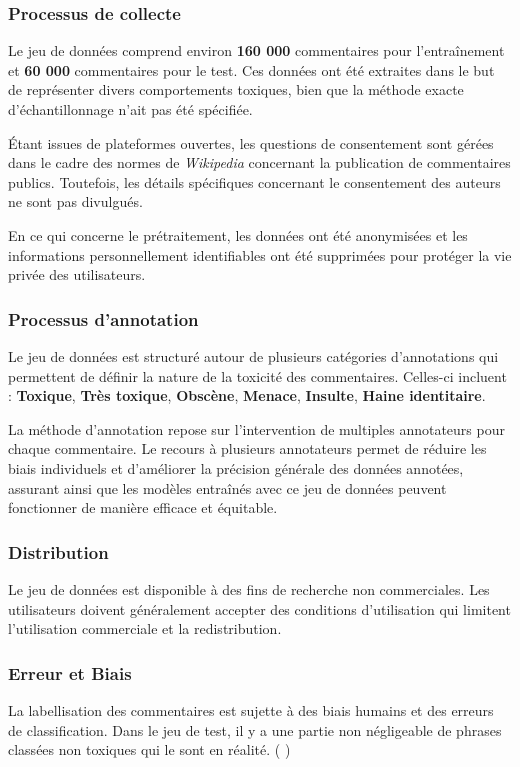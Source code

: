\newpage
\subsubsection*{Processus de collecte}
Le jeu de données comprend environ \textbf{160 000} commentaires pour l'entraînement et \textbf{60 000} commentaires pour le test. Ces données ont été extraites dans le but de représenter divers comportements toxiques, bien que la méthode exacte d'échantillonnage n'ait pas été spécifiée. 

Étant issues de plateformes ouvertes, les questions de consentement sont gérées dans le cadre des normes de \textit{Wikipedia} concernant la publication de commentaires publics. Toutefois, les détails spécifiques concernant le consentement des auteurs ne sont pas divulgués.

En ce qui concerne le prétraitement, les données ont été anonymisées et les informations personnellement identifiables ont été supprimées pour protéger la vie privée des utilisateurs. 

\subsubsection*{Processus d'annotation}
Le jeu de données est structuré autour de plusieurs catégories d'annotations qui permettent de définir la nature de la toxicité des commentaires. 
Celles-ci incluent :
\textbf{Toxique},
\textbf{Très toxique},
\textbf{Obscène},
\textbf{Menace},
\textbf{Insulte},
\textbf{Haine identitaire}.

La méthode d'annotation repose sur l'intervention de multiples annotateurs pour chaque commentaire.
Le recours à plusieurs annotateurs permet de réduire les biais individuels et d'améliorer la précision générale des données annotées, assurant ainsi que les modèles entraînés avec ce jeu de données peuvent fonctionner de manière efficace et équitable.

\subsubsection*{Distribution}
Le jeu de données est disponible à des fins de recherche non commerciales. Les utilisateurs doivent généralement accepter des conditions d'utilisation qui limitent l'utilisation commerciale et la redistribution.

\subsubsection*{Erreur et Biais}
La labellisation des commentaires est sujette à des biais humains et des erreurs de classification. 
Dans le jeu de test, il y a une partie non négligeable de phrases classées non toxiques qui le sont en réalité. (\cite{DBLP:journals/corr/abs-1809-07572} )
